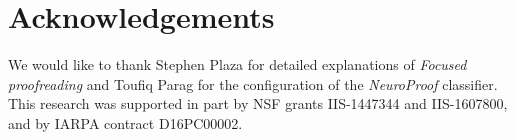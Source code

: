 
\vspace{-1mm}
\section*{Acknowledgements}
We would like to thank Stephen Plaza for detailed explanations of \emph{Focused proofreading} and Toufiq Parag for the configuration of the \emph{NeuroProof} classifier. This research was supported in part by NSF grants IIS-1447344 and IIS-1607800, and by IARPA contract D16PC00002.

